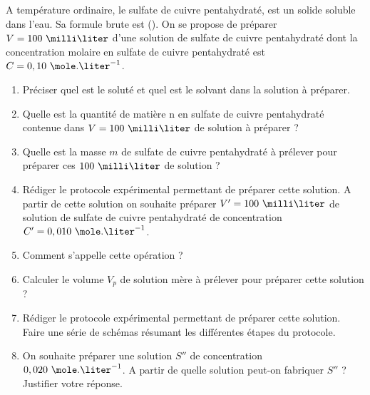 \vspace{0.3cm}

A température ordinaire, le sulfate de cuivre pentahydraté, est un solide soluble dans l'eau. Sa formule brute est ().\newline
On se propose de préparer $V = 100\text{ }\milli\liter$ d'une solution de sulfate de cuivre pentahydraté dont la concentration molaire en sulfate de cuivre pentahydraté est $C = 0,10\text{ }\mole.\liter^{-1}$.

\begin{enumerate}
\item Préciser quel est le soluté et quel est le solvant dans la solution à préparer.

\item Quelle est la quantité de matière n en sulfate de cuivre pentahydraté contenue dans $V = 100\text{ }\milli\liter$ de solution à préparer ?

\item Quelle est la masse $m$ de sulfate de cuivre pentahydraté à prélever pour préparer ces $100\text{ }\milli\liter$ de solution ?

\item Rédiger le protocole expérimental permettant de préparer cette solution.\newline
A partir de cette solution on souhaite préparer $V'=100\text{ }\milli\liter$ de solution de sulfate de cuivre pentahydraté de
concentration $C' = 0,010\text{ }\mole.\liter^{-1}$.

\item Comment s'appelle cette opération ?

\item Calculer le volume $V_{p}$ de solution mère à prélever pour préparer cette solution ?

\item Rédiger le protocole expérimental permettant de préparer cette solution.\newline
Faire une série de schémas résumant les différentes étapes du protocole.

\item On souhaite préparer une solution $S''$ de concentration $0,020\text{ }\mole.\liter^{-1}$. A partir de quelle solution peut-on fabriquer $S''$ ? Justifier votre réponse.

\end{enumerate}


